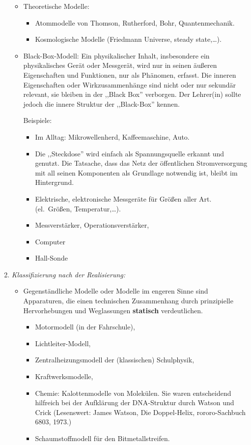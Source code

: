 \begin{enumerate}
\begin{itemize}
\item
Theoretische Modelle:
\begin{itemize}
\item Atommodelle von Thomson, Rutherford, Bohr, Quantenmechanik.
\item Kosmologische Modelle
(Friedmann Universe, steady state,\dots).
\end{itemize}

\item
Black-Box-Modell: Ein physikalischer Inhalt, insbesondere ein
physikalisches Ger\"{a}t oder Messger\"{a}t, wird nur in seinen \"{a}u{\ss}eren
Eigenschaften und Funktionen, nur als Ph\"{a}nomen, erfasst.
Die inneren Eigenschaften oder Wirkzusammenh\"{a}nge sind nicht
oder nur sekund\"{a}r relevant, sie bleiben in der ,,Black Box''
verborgen. Der Lehrer(in) sollte jedoch die innere Struktur der ,,Black-Box''
kennen.

\mip
Beispiele:
\begin{itemize}
\item Im Alltag: Mikrowellenherd, Kaffeemaschine, Auto.
\item Die ,,Steckdose'' wird einfach als Spannungsquelle
erkannt und genutzt. Die Tatsache, dass das Netz der \"{o}ffentlichen
Stromversorgung mit all seinen Komponenten als Grundlage notwendig ist,
bleibt im Hintergrund.
\item Elektrische, elektronische Messger\"{a}te f\"{u}r Gr\"{o}{\ss}en aller Art.
      (el.\ Gr\"{o}{\ss}en, Temperatur,\dots).
\item Messverst\"{a}rker, Operationsverst\"{a}rker,
\item Computer
\item Hall-Sonde
\end{itemize}

\end{itemize}

\bip
\item{\it{Klassifizierung nach der Realisierung:}}
\begin{itemize}
\item
Gegenst\"{a}ndliche Modelle oder Modelle im engeren Sinne sind Apparaturen, die
einen technischen Zusammenhang durch prinzipielle
Hervorhebungen und Weglassungen {\bf statisch} verdeutlichen.
\begin{itemize}
\item Motormodell (in der Fahrschule),
\item Lichtleiter-Modell,
\item Zentralheizungsmodell der (klassischen) Schulphysik,
\item Kraftwerksmodelle,
\item Chemie: Kalottenmodelle von Molek\"{u}len. Sie waren entscheidend hilfreich bei der
Aufkl\"{a}rung der DNA-Struktur durch Watson und Crick
(Lesenswert: James Watson, Die Doppel-Helix, rororo-Sachbuch 6803, 1973.)
\item
Schaumstoffmodell f\"{u}r den Bitmetallstreifen.
\end{itemize}


\end{itemize}
\end{enumerate}
